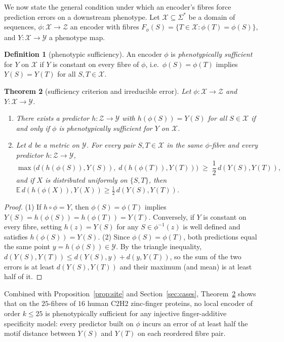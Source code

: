 \documentclass[11pt]{article}
\theoremstyle{plain}
\newtheorem{theorem}{Theorem}
\theoremstyle{definition}
\newtheorem{definition}[theorem]{Definition}
\theoremstyle{remark}
\begin{document}
We now state the general condition under which an encoder's fibres force prediction errors on a downstream phenotype.
Let $\mathcal X\subseteq\Sigma^*$ be a domain of sequences, $\phi\colon\mathcal X\to\mathcal Z$ an encoder with fibres
$F_\phi(S)=\{T\in\mathcal X:\phi(T)=\phi(S)\}$, and $Y\colon\mathcal X\to\mathcal Y$ a phenotype map.

\begin{definition}[phenotypic sufficiency]\label{def:suff}
An encoder $\phi$ is \emph{phenotypically sufficient} for $Y$ on $\mathcal X$ if $Y$ is constant on every fibre of
$\phi$, i.e.\ $\phi(S)=\phi(T)$ implies $Y(S)=Y(T)$ for all $S,T\in\mathcal X$.
\end{definition}

\begin{theorem}[sufficiency criterion and irreducible error]\label{thm:bound}
Let $\phi\colon\mathcal X\to\mathcal Z$ and $Y\colon\mathcal X\to\mathcal Y$.
\begin{enumerate}
\item There exists a predictor $h\colon\mathcal Z\to\mathcal Y$ with $h(\phi(S))=Y(S)$ for all $S\in\mathcal X$ if and
only if $\phi$ is phenotypically sufficient for $Y$ on $\mathcal X$.
\item Let $d$ be a metric on $\mathcal Y$. For every pair $S,T\in\mathcal X$ in the same $\phi$-fibre and every
predictor $h\colon\mathcal Z\to\mathcal Y$,
\[
\max\bigl(d(h(\phi(S)),Y(S)),\;d(h(\phi(T)),Y(T))\bigr)\;\ge\;\frac12\,d(Y(S),Y(T)),
\]
and if $X$ is distributed uniformly on $\{S,T\}$, then $\mathbb E\,d(h(\phi(X)),Y(X))\ge\frac12\,d(Y(S),Y(T))$.
\end{enumerate}
\end{theorem}

\begin{proof}
(1) If $h\circ\phi=Y$, then $\phi(S)=\phi(T)$ implies $Y(S)=h(\phi(S))=h(\phi(T))=Y(T)$. Conversely, if $Y$ is
constant on every fibre, setting $h(z)=Y(S)$ for any $S\in\phi^{-1}(z)$ is well defined and satisfies $h(\phi(S))=Y(S)$.
(2) Since $\phi(S)=\phi(T)$, both predictions equal the same point $y=h(\phi(S))\in\mathcal Y$. By the triangle
inequality, $d(Y(S),Y(T))\le d(Y(S),y)+d(y,Y(T))$, so the sum of the two errors is at least $d(Y(S),Y(T))$ and their
maximum (and mean) is at least half of it.
\end{proof}

Combined with Proposition~\ref{prop:site} and Section~\ref{sec:cases}, Theorem~\ref{thm:bound} shows that on the
$25$-fibres of $16$ human C2H2 zinc-finger proteins, no local encoder of order $k\le25$ is phenotypically sufficient
for any injective finger-additive specificity model: every predictor built on $\phi$ incurs an error of at least half
the motif distance between $Y(S)$ and $Y(T)$ on each reordered fibre pair.
\end{document}
